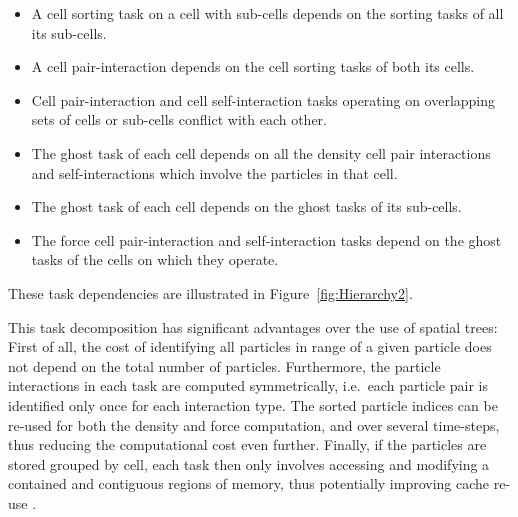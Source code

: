 \documentclass[a4paper,conference]{IEEEtran}
\newcommand{\fig}[1]
    {Figure~\ref{fig:#1}}
\begin{document}
\begin{itemize}

    \item A cell sorting task on a cell with sub-cells depends
        on the sorting tasks of all its sub-cells.

    \item A cell pair-interaction depends on the cell sorting
        tasks of both its cells.
        
    \item Cell pair-interaction and cell self-interaction tasks
        operating on overlapping sets of cells or sub-cells
        conflict with each other.
        
    \item The ghost task of each cell depends on all the density cell pair
        interactions and self-interactions which involve the particles
        in that cell.
        
    \item The ghost task of each cell depends on the ghost tasks of
        its sub-cells.
        
    \item The force cell pair-interaction and self-interaction tasks
        depend on the ghost tasks of the cells on which they operate.

\end{itemize}

\noindent These task dependencies are illustrated in \fig{Hierarchy2}.

This task decomposition has significant advantages over the use of
spatial trees:
First of all, the cost of identifying all particles in range of
a given particle does not depend on the total number of
particles.
Furthermore, the particle interactions in each task are computed
symmetrically, i.e.~each particle pair is identified only
once for each interaction type.
The sorted particle indices can be re-used for both the
density and force computation, and over several time-steps,
thus reducing the computational cost even further.
Finally, if the particles are stored grouped by cell, each task
then only involves accessing and modifying a contained
and contiguous regions of memory, thus potentially improving
cache re-use \cite{ref:Fomin2011}.
\end{document}
